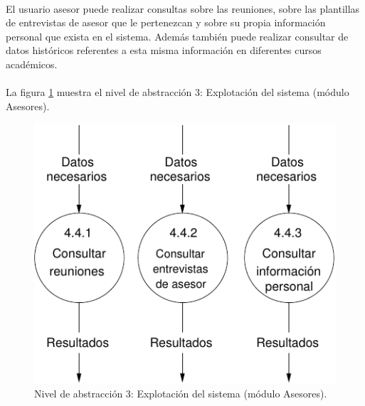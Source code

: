\paragraph{}El usuario asesor puede realizar consultas sobre las reuniones,
sobre las plantillas de entrevistas de asesor que le pertenezcan y sobre su
propia información personal que exista en el sistema. Además también puede
realizar consultar de datos históricos referentes a esta misma información en
diferentes cursos académicos.

\paragraph{}La figura \ref{diagramaNivel3-ExplotacionSistema-asesores}
muestra el nivel de abstracción 3: Explotación del sistema (módulo Asesores).

  \begin{figure}[!ht]
    \begin{center}
      \includegraphics[]{08.Analisis_Funcional/8.2.DFDs/Niveles/Nivel3/Asesores/ExplotacionSistema/Diagramas/nivel3-ExplotacionSistema.pdf}
      \caption{Nivel de abstracción 3: Explotación del sistema (módulo Asesores).}
      \label{diagramaNivel3-ExplotacionSistema-asesores}
    \end{center}
  \end{figure}

